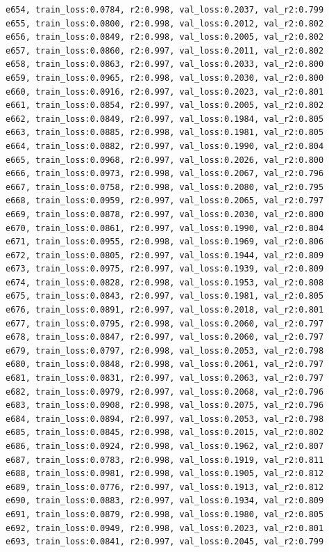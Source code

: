\documentclass[a4paper, 12pt]{article}
\begin{document}
\begin{lstlisting}
e654, train_loss:0.0784, r2:0.998, val_loss:0.2037, val_r2:0.799
e655, train_loss:0.0800, r2:0.998, val_loss:0.2012, val_r2:0.802
e656, train_loss:0.0849, r2:0.998, val_loss:0.2005, val_r2:0.802
e657, train_loss:0.0860, r2:0.997, val_loss:0.2011, val_r2:0.802
e658, train_loss:0.0863, r2:0.997, val_loss:0.2033, val_r2:0.800
e659, train_loss:0.0965, r2:0.998, val_loss:0.2030, val_r2:0.800
e660, train_loss:0.0916, r2:0.997, val_loss:0.2023, val_r2:0.801
e661, train_loss:0.0854, r2:0.997, val_loss:0.2005, val_r2:0.802
e662, train_loss:0.0849, r2:0.997, val_loss:0.1984, val_r2:0.805
e663, train_loss:0.0885, r2:0.998, val_loss:0.1981, val_r2:0.805
e664, train_loss:0.0882, r2:0.997, val_loss:0.1990, val_r2:0.804
e665, train_loss:0.0968, r2:0.997, val_loss:0.2026, val_r2:0.800
e666, train_loss:0.0973, r2:0.998, val_loss:0.2067, val_r2:0.796
e667, train_loss:0.0758, r2:0.998, val_loss:0.2080, val_r2:0.795
e668, train_loss:0.0959, r2:0.997, val_loss:0.2065, val_r2:0.797
e669, train_loss:0.0878, r2:0.997, val_loss:0.2030, val_r2:0.800
e670, train_loss:0.0861, r2:0.997, val_loss:0.1990, val_r2:0.804
e671, train_loss:0.0955, r2:0.998, val_loss:0.1969, val_r2:0.806
e672, train_loss:0.0805, r2:0.997, val_loss:0.1944, val_r2:0.809
e673, train_loss:0.0975, r2:0.997, val_loss:0.1939, val_r2:0.809
e674, train_loss:0.0828, r2:0.998, val_loss:0.1953, val_r2:0.808
e675, train_loss:0.0843, r2:0.997, val_loss:0.1981, val_r2:0.805
e676, train_loss:0.0891, r2:0.997, val_loss:0.2018, val_r2:0.801
e677, train_loss:0.0795, r2:0.998, val_loss:0.2060, val_r2:0.797
e678, train_loss:0.0847, r2:0.997, val_loss:0.2060, val_r2:0.797
e679, train_loss:0.0797, r2:0.998, val_loss:0.2053, val_r2:0.798
e680, train_loss:0.0848, r2:0.998, val_loss:0.2061, val_r2:0.797
e681, train_loss:0.0831, r2:0.997, val_loss:0.2063, val_r2:0.797
e682, train_loss:0.0979, r2:0.997, val_loss:0.2068, val_r2:0.796
e683, train_loss:0.0908, r2:0.998, val_loss:0.2075, val_r2:0.796
e684, train_loss:0.0894, r2:0.997, val_loss:0.2053, val_r2:0.798
e685, train_loss:0.0845, r2:0.998, val_loss:0.2015, val_r2:0.802
e686, train_loss:0.0924, r2:0.998, val_loss:0.1962, val_r2:0.807
e687, train_loss:0.0783, r2:0.998, val_loss:0.1919, val_r2:0.811
e688, train_loss:0.0981, r2:0.998, val_loss:0.1905, val_r2:0.812
e689, train_loss:0.0776, r2:0.997, val_loss:0.1913, val_r2:0.812
e690, train_loss:0.0883, r2:0.997, val_loss:0.1934, val_r2:0.809
e691, train_loss:0.0879, r2:0.998, val_loss:0.1980, val_r2:0.805
e692, train_loss:0.0949, r2:0.998, val_loss:0.2023, val_r2:0.801
e693, train_loss:0.0841, r2:0.997, val_loss:0.2045, val_r2:0.799

\end{lstlisting}
\end{document}

